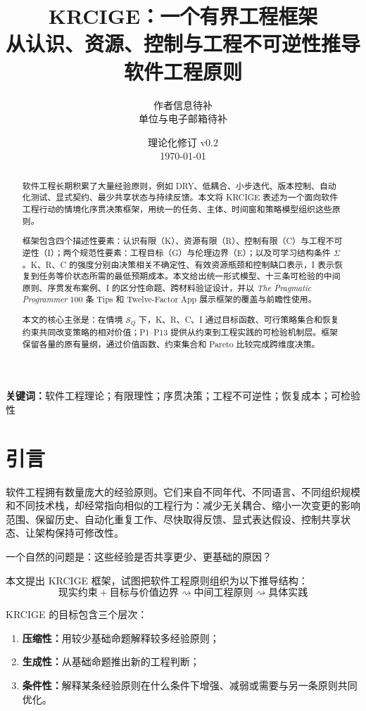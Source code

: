 \documentclass[11pt,a4paper]{ctexart}
\title{\textbf{KRCIGE：一个有界工程框架}\\[0.35em]
\large 从认识、资源、控制与工程不可逆性推导软件工程原则}
\author{作者信息待补\\[-0.1em]
\small 单位与电子邮箱待补}
\date{\small 理论化修订 v0.2\\[0.25em]\today}
\numberwithin{equation}{section}
\theoremstyle{definition}
\theoremstyle{plain}
\newcommand{\PP}{\textit{The Pragmatic Programmer}}
\begin{document}
\maketitle

\begin{abstract}
软件工程长期积累了大量经验原则，例如 DRY、低耦合、小步迭代、版本控制、自动化测试、显式契约、最少共享状态与持续反馈。本文将 KRCIGE 表述为一个面向软件工程行动的情境化序贯决策框架，用统一的任务、主体、时间窗和策略模型组织这些原则。

框架包含四个描述性要素：认识有限（K）、资源有限（R）、控制有限（C）与工程不可逆性（I）；两个规范性要素：工程目标（G）与伦理边界（E）；以及可学习结构条件 $\Sigma$。K、R、C 的强度分别由决策相关不确定性、有效资源瓶颈和控制缺口表示，I 表示恢复到任务等价状态所需的最低预期成本。本文给出统一形式模型、十三条可检验的中间原则、序贯发布案例、I 的区分性命题、跨材料验证设计，并以 \PP{} 100 条 Tips 和 Twelve-Factor App 展示框架的覆盖与前瞻性使用。

本文的核心主张是：在情境 $\mathcal S_Q$ 下，K、R、C、I 通过目标函数、可行策略集合和恢复约束共同改变策略的相对价值；P1--P13 提供从约束到工程实践的可检验机制层。框架保留各量的原有量纲，通过价值函数、约束集合和 Pareto 比较完成跨维度决策。
\end{abstract}

\noindent\textbf{关键词：}软件工程理论；有限理性；序贯决策；工程不可逆性；恢复成本；可检验性

\section{引言}

软件工程拥有数量庞大的经验原则。它们来自不同年代、不同语言、不同组织规模和不同技术栈，却经常指向相似的工程行为：减少无关耦合、缩小一次变更的影响范围、保留历史、自动化重复工作、尽快取得反馈、显式表达假设、控制共享状态、让架构保持可修改性。

一个自然的问题是：这些经验是否共享更少、更基础的原因？

本文提出 KRCIGE 框架，试图把软件工程原则组织为以下推导结构：
\begin{equation}
\boxed{
\text{现实约束}
+
\text{目标与价值边界}
\rightsquigarrow
\text{中间工程原则}
\rightsquigarrow
\text{具体实践}
}
\end{equation}

KRCIGE 的目标包含三个层次：
\begin{enumerate}[label=(\arabic*)]
    \item \textbf{压缩性：}用较少基础命题解释较多经验原则；
    \item \textbf{生成性：}从基础命题推出新的工程判断；
    \item \textbf{条件性：}解释某条经验原则在什么条件下增强、减弱或需要与另一条原则共同优化。
\end{enumerate}
\end{document}
